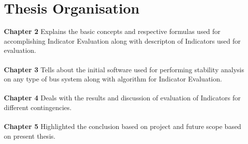 \section{Thesis Organisation}
\noindent \textbf{Chapter 2} \tab Explains the basic concepts and respective formulas used for accomplishing Indicator Evaluation along with descripton of Indicators used for evaluation.  
\\ \\\textbf{Chapter 3} \tab Tells about the initial software used for performing stability analysis on any type of bus system along with algorithm for Indicator Evaluation.
\\ \\\textbf{Chapter 4} \tab Deals with the results and discussion of evaluation of Indicators for different contingencies.  
\\ \\\textbf{Chapter 5} \tab Highlighted the conclusion based on project and future scope based on present thesis. 